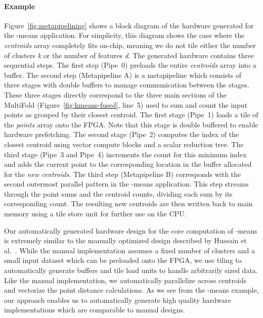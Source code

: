 \documentclass[pageno]{jpaper}
\begin{document}
\paragraph{Example}
Figure~\ref{fig:metapipelining} shows a block diagram of the hardware generated for the -means application.
For simplicity, this diagram shows the case where the \emph{centroids} array completely fits on-chip, meaning
we do not tile either the number of clusters \emph{k} or the number of features \emph{d}.
The generated hardware contains three sequential steps. The first step (Pipe~0) preloads the entire \emph{centroids} array into a buffer.
The second step (Metapipeline A) is a metapipeline which consists of three stages with double buffers to manage communication between the stages.
These three stages directly correspond to the three main sections of the MultiFold (Figure~\ref{fig:kmeans-fused}, line~5) used to sum and count the input points as grouped by their
closest centroid. The first stage (Pipe~1) loads a tile of the \emph{points} array onto the FPGA. Note that this stage is double buffered to
enable hardware prefetching. The second stage (Pipe~2) computes the index of the closest centroid using vector compute blocks and a scalar reduction
tree. The third stage (Pipe~3 and Pipe~4) increments the count for this minimum index and adds the current point to the corresponding location in the
buffer allocated for the \emph{new centroids}.
The third step (Metapipeline B) corresponds with the second outermost parallel pattern in the -means application.
This step streams through the point sums and the centroid counts, dividing each sum by its corresponding count. The resulting new centroids
are then written back to main memory using a tile store unit for further use on the CPU.

Our automatically generated hardware design for the core computation of -means is extremely similar to the manually optimized design described by Hussain et al.~\cite{hwkmeans}.
While the manual implementation assumes a fixed number of clusters and a small input dataset which can be preloaded onto the FPGA, we use tiling to automatically generate
buffers and tile load units to handle arbitrarily sized data. Like the manual implementation, we automatically parallelize across centroids
and vectorize the point distance calculations. As we see from the -means example, our approach enables us to automatically generate high quality hardware implementations which are comparable to manual designs.
\end{document}
